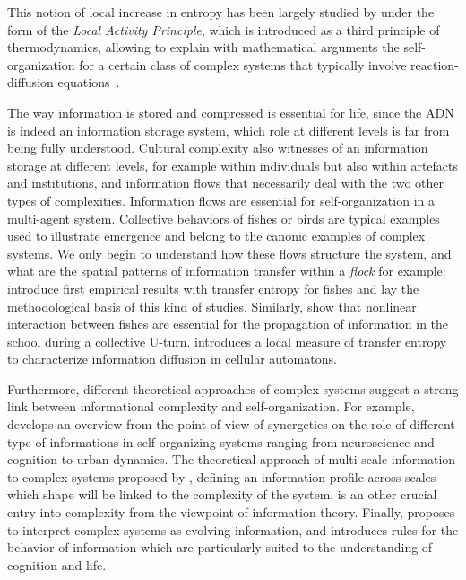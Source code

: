This notion of local increase in entropy has been largely studied by  under the form of the \emph{Local Activity Principle}, which is introduced as a third principle of thermodynamics, allowing to explain with mathematical arguments the self-organization for a certain class of complex systems that typically involve reaction-diffusion equations~\cite{mainzer2013local}.


The way information is stored and compressed is essential for life, since the ADN is indeed an information storage system, which role at different levels is far from being fully understood. Cultural complexity also witnesses of an information storage at different levels, for example within individuals but also within artefacts and institutions, and information flows that necessarily deal with the two other types of complexities. Information flows are essential for self-organization in a multi-agent system. Collective behaviors of fishes or birds are typical examples used to illustrate emergence and belong to the canonic examples of complex systems. We only begin to understand how these flows structure the system, and what are the spatial patterns of information transfer within a \emph{flock} for example: \cite{crosato2017informative} introduce first empirical results with transfer entropy for fishes and lay the methodological basis of this kind of studies. Similarly, \cite{lecheval2018social} show that nonlinear interaction between fishes are essential for the propagation of information in the school during a collective U-turn. \cite{lizier2008local} introduces a local measure of transfer entropy to characterize information diffusion in cellular automatons.

Furthermore, different theoretical approaches of complex systems suggest a strong link between informational complexity and self-organization. For example, \cite{e18060197} develops an overview from the point of view of synergetics on the role of different type of informations in self-organizing systems ranging from neuroscience and cognition to urban dynamics. The theoretical approach of multi-scale information to complex systems proposed by \cite{allen2017multiscale}, defining an information profile across scales which shape will be linked to the complexity of the system, is an other crucial entry into complexity from the viewpoint of information theory. Finally, \cite{gershenson2012world} proposes to interpret complex systems as evolving information, and introduces rules for the behavior of information which are particularly suited to the understanding of cognition and life. 


